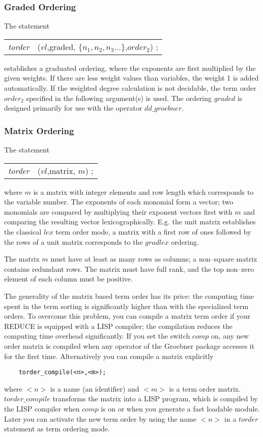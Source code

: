 \subsubsection{Graded Ordering}
 
The statement
\begin{center}
\begin{tabular}{cl}
{\it torder} &($vl$,graded, $\{n_1,n_2,n_3 \ldots\}$,$order_2$) ; \\
\end{tabular}
\end{center}
establishes a graduated ordering, where the exponents are first
multiplied by the given weights. If there are less weight values than
variables, the weight 1 is added automatically. If the weighted
degree calculation is not decidable, the term order $order_2$ specified
in the following argument(s) is used.  The ordering $graded$ is designed
primarily for use with the operator $dd\_groebner$.

\subsubsection{Matrix Ordering}
 
The statement
\begin{center}
\begin{tabular}{cl}
{\it torder} &($vl$,matrix, $m$) ; \\
\end{tabular}
\end{center}
where $m$ is a matrix with integer elements and row length which
corresponds to the variable number. The exponents of each monomial
form a vector; two monomials are compared by multiplying their
exponent vectors first with $m$ and comparing the resulting vector
lexicographically. E.g. the unit matrix establishes the classical
$lex$ term order mode, a matrix with a first row of ones followed
by the rows of a unit matrix corresponds to the $gradlex$ ordering.

The matrix $m$ must have at least as many rows as columns; a non--square
matrix contains redundant rows. The matrix must have full rank, and
the top non--zero element of each column must be positive.

The generality of the matrix based term order has its price: the
computing time spent in the term sorting is significantly higher
than with the specialized term orders. To overcome this problem,
you can compile a matrix term order
if your REDUCE is equipped with a LISP compiler; the
compilation reduces the computing time overhead significantly.
If you set the switch $comp$ on, any new order matrix is compiled
when any operator of the Groebner package accesses it for the
first time. Alternatively you can compile a matrix explicitly
\begin{verbatim}
    torder_compile(<n>,<m>);
\end{verbatim}
where $<n>$ is a name (an identifier) and $<m>$ is a term order matrix.
$torder\_compile$ transforms the matrix into a LISP program, which
is compiled by the LISP compiler when $comp$ is on or when you
generate a fast loadable module. Later you can activate the new term
order by using the name $<n>$ in a $torder$ statement as term ordering
mode.

